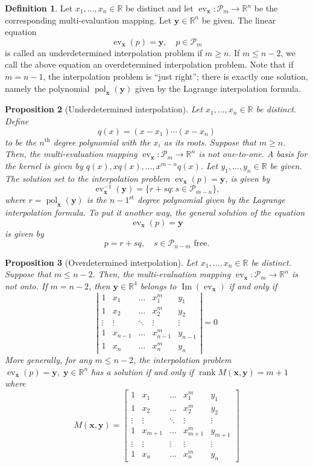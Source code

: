 \documentclass[12pt]{article}
\newtheorem{proposition}{Proposition}
\theoremstyle{definition}
\newtheorem{definition}[proposition]{Definition}
\newcommand{\bx}{\mathbf{x}}
\newcommand{\by}{\mathbf{y}}
\newcommand{\ev}{\operatorname{ev}}
\newcommand{\pol}{\operatorname{pol}}
\newcommand{\img}{\operatorname{Im}}
\newcommand{\orank}{\operatorname{rank}}
\newcommand{\cP}{\mathcal{P}}
\newcommand{\Rset}{\mathbb{R}}
\begin{document}
\begin{definition} Let $x_1,\ldots, x_n\in \Rset$ be distinct and let
  $\ev_\bx:\cP_m\to \Rset^n$ be the corresponding multi-evaluation
  mapping.  Let $\by\in \Rset^n$ be given.  The linear equation
  \[ \ev_{\bx}(p) = \by,\quad p \in \cP_m\]
  is called an underdetermined interpolation problem if $m\geq n$.
  If $m\leq n-2$, we call the above equation an overdetermined
  interpolation problem.  Note that if $m=n-1$, the interpolation
  problem is ``just right''; there is exactly one solution, namely the
  polynomial
  $\pol_\bx(\by)$ given by the Lagrange interpolation formula.
\end{definition}
\begin{proposition}[Underdetermined interpolation]
  Let $x_1,\ldots, x_n\in \Rset$ be distinct.  Define
  \[ q(x) = (x-x_1)\cdots (x-x_n)\]
  to be the $n^{\text{th}}$ degree polynomial with the $x_i$ as its roots.
  Suppose that $m\geq n$. Then,
  the multi-evaluation mapping
  $\ev_\bx:\cP_m\to \Rset^n$ is not one-to-one.  A basis for the
  kernel is given by  $q(x), x q(x),\ldots,
  x^{m-n} q(x)$.  Let $y_1,\ldots, y_n\in \Rset$ be given. The solution
  set to the interpolation problem $\ev_\bx(p) = \by$, is given by
  \[ \ev_\bx^{-1}(\by) = \{ r + s q : s \in \cP_{m-n} \}, \]
  where
  $r = \pol_\bx(\by)$
  is the $n-1^\text{st}$ degree polynomial given by the Lagrange
  interpolation formula.  To put it another way, the general solution
  of the equation
  \[ \ev_\bx(p)= \by \]
  is given by
  \[ p = r + s q,\quad s\in \cP_{n-m}\text{ free.}\]
\end{proposition}
\begin{proposition}[Overdetermined interpolation]
   Let $x_1,\ldots, x_n\in \Rset$ be distinct. 
  Suppose that $m\leq n-2$. Then,
  the multi-evaluation mapping
  $\ev_\bx:\cP_m\to \Rset^n$ is not onto.  If $m=n-2$, then
  $\by\in\Rset^4$ belongs to $\img(\ev_\bx)$ if and only  if
  \[ \left| \begin{matrix}
        1 & x_1 & \ldots & x_1^{m}& y_1 \\
        1 & x_2 & \ldots &x_2^{m}&y_2 \\
        \vdots & \vdots & \ddots  & \vdots &\vdots\\
        1 & x_{n-1} & \ldots &x_{n-1}^{m}&y_{n-1} \\
        1& x_n & \ldots & x_n^{m} & y_n
      \end{matrix}
    \right|=0\]
    More generally, for any $m\leq n-2$, the interpolation problem
    $\ev_\bx(p)=\by,\; \by\in \Rset^n$ has a solution if and only
    if $\orank M(\bx,\by) = m+1$ where
    \[ M(\bx,\by)= \begin{bmatrix}
        1 & x_1 & \ldots & x_1^{m}& y_1 \\
        1 & x_2 & \ldots &x_2^{m}&y_2 \\
        \vdots & \vdots & \ddots  & \vdots &\vdots\\
        1 & x_{m+1} & \ldots &x_{m+1}^{m}&y_{m+1} \\
        \vdots & \vdots & \vdots & \vdots &\vdots\\
        1& x_n & \ldots & x_n^{m} & y_n
      \end{bmatrix} \]
\end{proposition}
\end{document}
